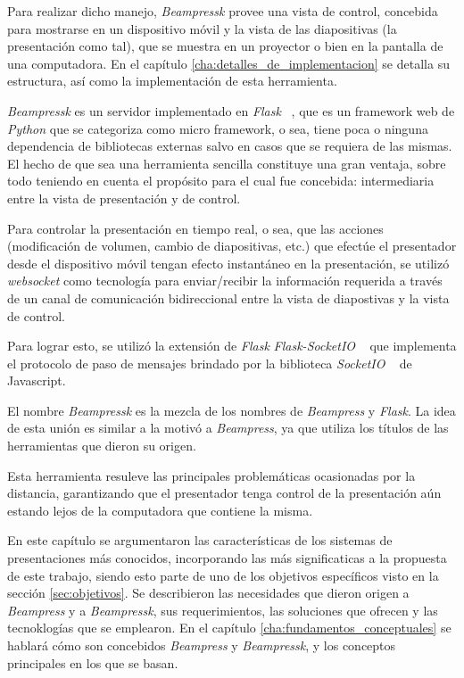		Para realizar dicho manejo, \textit{Beampressk} provee una vista de control, concebida para mostrarse en un dispositivo móvil y la vista de las diapositivas (la presentación como tal), que se muestra en un proyector o bien en la pantalla de una computadora. En el capítulo \ref{cha:detalles_de_implementacion} se detalla su estructura, así como la implementación de esta herramienta.

		\textit{Beampressk} es un servidor implementado en \textit{Flask} ~\cite{flask}, que es un framework web de \textit{Python} que se categoriza como micro framework, o sea, tiene poca o ninguna dependencia de bibliotecas externas salvo en casos que se requiera de las mismas. El hecho de que sea una herramienta sencilla constituye una gran ventaja, sobre todo teniendo en cuenta el propósito para el cual fue concebida: intermediaria entre la vista de presentación y de control.

		Para controlar la presentación en tiempo real, o sea, que las acciones (modificación de volumen, cambio de diapositivas, etc.) que efectúe el presentador desde el dispositivo móvil tengan efecto instantáneo en la presentación, se utilizó \textit{websocket} como tecnología para enviar/recibir la información requerida a través de un canal de comunicación bidireccional entre la vista de diapostivas y la vista de control.

		Para lograr esto, se utilizó la extensión de \textit{Flask} \textit{Flask-SocketIO} ~\cite{flasksocket} que implementa el protocolo de paso de mensajes brindado por la biblioteca \textit{SocketIO} ~\cite{socketio} de Javascript.

		El nombre \textit{Beampressk} es la mezcla de los nombres de \textit{Beampress} y \textit{Flask}. La idea de esta unión es similar a la motivó a \textit{Beampress}, ya que utiliza los títulos de las herramientas que dieron su origen.

		Esta herramienta resuleve las principales problemáticas ocasionadas por la distancia, garantizando que el presentador tenga control de la presentación aún estando lejos de la computadora que contiene la misma.

		En este capítulo se argumentaron las características de los sistemas de presentaciones más conocidos, incorporando las más significaticas a la propuesta de este trabajo, siendo esto parte de uno de los objetivos específicos visto en la sección \ref{sec:objetivos}. Se describieron las necesidades que dieron origen a \textit{Beampress} y a \textit{Beampressk}, sus requerimientos, las soluciones que ofrecen y las tecnoklogías que se emplearon. En el capítulo \ref{cha:fundamentos_conceptuales} se hablará cómo son concebidos \textit{Beampress} y \textit{Beampressk}, y los conceptos principales en los que se basan.






